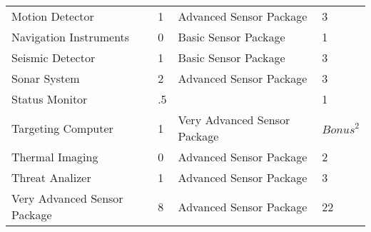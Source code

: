 \documentclass[twoside]{book}
\begin{document}
\begin{longtable}{p{1.25in}lll}
      \raggedright  Motion Detector& 1& Advanced Sensor Package& 3\tabularnewline
      \raggedright  Navigation Instruments& 0& Basic Sensor Package& 1\tabularnewline
      \raggedright  Seismic Detector& 1& Basic Sensor Package& 3\tabularnewline
      \raggedright  Sonar System& 2& Advanced Sensor Package& 3\tabularnewline
      \raggedright  Status Monitor& .5&& 1\tabularnewline
      \raggedright  Targeting Computer& 1& Very Advanced Sensor
           Package& \begin{math}{Bonus}^{2}\end{math}\tabularnewline
      \raggedright  Thermal Imaging& 0& Advanced Sensor Package& 2\tabularnewline
      \raggedright  Threat Analizer& 1& Advanced Sensor Package& 3\tabularnewline
      \raggedright  Very Advanced Sensor Package& 8& Advanced Sensor Package& 22\tabularnewline
      
\end{longtable}
    
\end{document}
